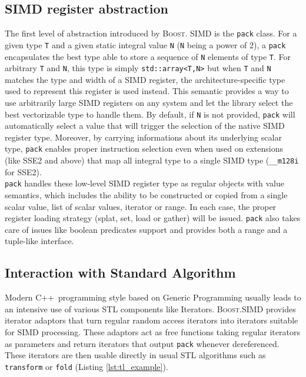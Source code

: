 \documentclass[10pt]{sigplanconf}
\providecommand{\boostsimd}{\textsc{Boost.SIMD}}
\providecommand{\cpp}[1][~]{\textsc{C++}#1}
\begin{document}
\subsection{SIMD register abstraction}
The first level of abstraction introduced by \textsc{Boost.} \textsc{SIMD} is
the \texttt{pack} class. For a given type \texttt{T} and a given static integral 
value \texttt{N} (\texttt{N} being a power of 2), a \texttt{pack} encapsulates
the best type able to store a sequence of \texttt{N} elements of type \texttt{T}.
For arbitrary \texttt{T} and \texttt{N}, this type is simply \texttt{std::array<T,N>}
but when \texttt{T} and \texttt{N} matches the type and width of a SIMD register,
the architecture-specific type used to represent this register is used instead.
This semantic provides a way to use arbitrarily large SIMD registers on any system
and let the library select the best vectorizable type to handle them. By default,
if \texttt{N} is not provided, \texttt{pack} will automatically select a value
that will trigger the selection of the native SIMD register type. Moreover, by
carrying informations about its underlying scalar type, \texttt{pack} enables
proper instruction selection even when used on extensions (like SSE2 and above)
that map all integral type to a single SIMD type (\texttt{\_\_m128i} for SSE2).\\

\texttt{pack} handles these low-level SIMD register type as regular objects with
value semantics, which includes the ability to be constructed or copied from a
single scalar value, list of scalar values, iterator or range. In each case, the
proper register loading strategy (splat, set, load or gather) will be issued.
\texttt{pack} also takes care of issues like boolean predicates support and provides
both a range and a tuple-like interface.

\subsection{Interaction with Standard Algorithm}
Modern \cpp programming style based on Generic Programming usually leads to an
intensive use of various STL components like Iterators. \boostsimd{} provides
iterator adaptors that turn regular random access iterators into iterators
suitable for SIMD processing. These adaptors act as free functions taking
regular iterators as parameters and return iterators that output \texttt{pack}
whenever dereferenced. These iterators are then usable directly in usual STL
algorithms such as \texttt{transform} or \texttt{fold} (Listing \ref{lst:tl_example}).
\end{document}
